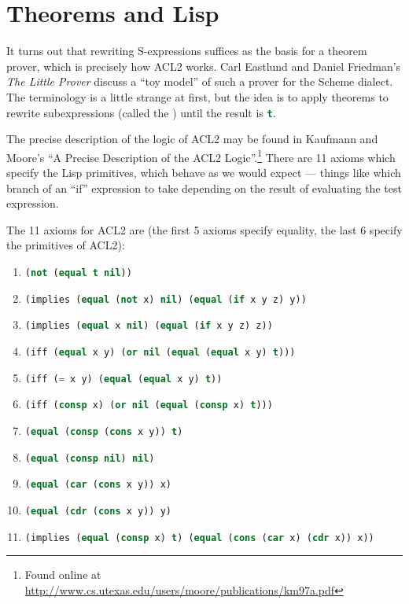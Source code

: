\chapter{Theorems and Lisp}

\M
It turns out that rewriting S-expressions suffices as the basis for a
theorem prover, which is precisely how ACL2 works. Carl Eastlund and
Daniel Friedman's \textit{The Little Prover} discuss a ``toy model'' of
such a prover for the Scheme dialect. The terminology is a little
strange at first, but the idea is to apply theorems to rewrite
subexpressions (called the ) until the result is
\lstinline[language=lisp]{t}. 

\M The precise description of the logic of ACL2 may be found in Kaufmann
and Moore's ``A Precise Description of the ACL2 Logic''.\footnote{Found online at \url{http://www.cs.utexas.edu/users/moore/publications/km97a.pdf}}
There are 11 axioms which specify the Lisp primitives, which behave as
we would expect --- things like which branch of an ``if'' expression to
take depending on the result of evaluating the test expression.

The 11 axioms for ACL2 are (the first 5 axioms specify equality, the
last 6 specify the primitives of ACL2):
\begin{enumerate}
\item \lstinline[language=lisp]{(not (equal t nil))}
\item \lstinline[language=lisp]{(implies (equal (not x) nil) (equal (if x y z) y))}
\item \lstinline[language=lisp]{(implies (equal x nil) (equal (if x y z) z))}
\item \lstinline[language=lisp]{(iff (equal x y) (or nil (equal (equal x y) t)))}
\item \lstinline[language=lisp]{(iff (= x y) (equal (equal x y) t))}
\item \lstinline[language=lisp]{(iff (consp x) (or nil (equal (consp x) t)))}
\item \lstinline[language=lisp]{(equal (consp (cons x y)) t)}
\item \lstinline[language=lisp]{(equal (consp nil) nil)}
\item \lstinline[language=lisp]{(equal (car (cons x y)) x)}
\item \lstinline[language=lisp]{(equal (cdr (cons x y)) y)}
\item \lstinline[language=lisp]{(implies (equal (consp x) t) (equal (cons (car x) (cdr x)) x))}
\end{enumerate}

